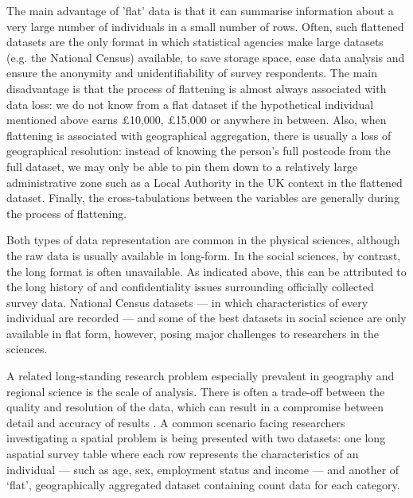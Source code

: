 \documentclass[a4paper,10pt]{article}
\begin{document}
The main advantage of 'flat' data is that it can summarise information about a very large number of individuals
in a small number of rows. Often, such flattened datasets are the only format in which 
statistical agencies make large datasets (e.g. the National Census) available, 
to save storage space, ease data analysis and ensure the anonymity and unidentifiability of survey respondents.
The main disadvantage is that the process of flattening is almost always associated with data loss: we do 
not know from a flat dataset if the hypothetical individual mentioned above earns \pounds10,000, \pounds15,000 or 
anywhere in between. Also, when flattening is associated with geographical aggregation, there is usually
a loss of geographical resolution: instead of knowing the person's full postcode from the full dataset, we 
may only be able to pin them down to a relatively large administrative zone such as a Local Authority in the UK context
in the flattened dataset. Finally, the cross-tabulations between the variables are generally during the process of 
flattening.

Both types of data representation are common in the physical sciences, although the raw data 
is usually available in long-form. In the social sciences, by contrast, the long format is often unavailable. 
As indicated above, this can be attributed to the long history of and confidentiality 
issues surrounding officially collected survey data. National Census datasets --- in which characteristics of 
every individual are recorded --- and some of the best datasets in social science are only available 
in flat form, however, posing major challenges to researchers in the sciences. 

A related long-standing research problem especially prevalent in geography and regional science
is the scale of analysis. There is often a trade-off between the quality and resolution 
of the data, which can result in a compromise between detail and accuracy of results 
\citep{ballas2003microsimulation-30-years}. A common scenario facing researchers investigating 
a spatial problem is being presented with two datasets: one long aspatial 
survey table where each row represents the characteristics of an individual --- such as
age, sex, employment status and income --- and another of `flat', geographically aggregated 
dataset containing count data for each category. 
\end{document}
